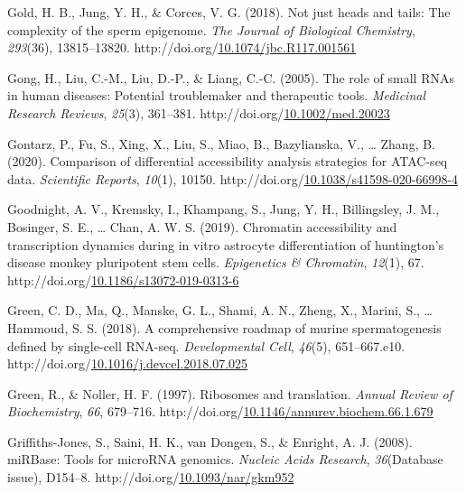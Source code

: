 \documentclass[12pt,twoside]{reedthesis}
\newlength{\cslhangindent}
\newenvironment{CSLReferences}[2] %
 {%
  \setlength{\parindent}{0pt}
  \ifodd #1 \everypar{\setlength{\hangindent}{\cslhangindent}}\ignorespaces\fi
  \ifnum #2 > 0
  \setlength{\parskip}{#2\baselineskip}
  \fi
 }%
 {}
\begin{document}
\begin{CSLReferences}{1}{0}
\leavevmode{}%
Gold, H. B., Jung, Y. H., \& Corces, V. G. (2018). Not just heads and tails: The complexity of the sperm epigenome. \emph{The Journal of Biological Chemistry}, \emph{293}(36), 13815--13820. http://doi.org/\href{https://doi.org/10.1074/jbc.R117.001561}{10.1074/jbc.R117.001561}

\leavevmode{}%
Gong, H., Liu, C.-M., Liu, D.-P., \& Liang, C.-C. (2005). The role of small RNAs in human diseases: Potential troublemaker and therapeutic tools. \emph{Medicinal Research Reviews}, \emph{25}(3), 361--381. http://doi.org/\href{https://doi.org/10.1002/med.20023}{10.1002/med.20023}

\leavevmode{}%
Gontarz, P., Fu, S., Xing, X., Liu, S., Miao, B., Bazylianska, V., \ldots{} Zhang, B. (2020). Comparison of differential accessibility analysis strategies for ATAC-seq data. \emph{Scientific Reports}, \emph{10}(1), 10150. http://doi.org/\href{https://doi.org/10.1038/s41598-020-66998-4}{10.1038/s41598-020-66998-4}

\leavevmode{}%
Goodnight, A. V., Kremsky, I., Khampang, S., Jung, Y. H., Billingsley, J. M., Bosinger, S. E., \ldots{} Chan, A. W. S. (2019). Chromatin accessibility and transcription dynamics during in vitro astrocyte differentiation of huntington's disease monkey pluripotent stem cells. \emph{Epigenetics \& Chromatin}, \emph{12}(1), 67. http://doi.org/\href{https://doi.org/10.1186/s13072-019-0313-6}{10.1186/s13072-019-0313-6}

\leavevmode{}%
Green, C. D., Ma, Q., Manske, G. L., Shami, A. N., Zheng, X., Marini, S., \ldots{} Hammoud, S. S. (2018). A comprehensive roadmap of murine spermatogenesis defined by single-cell RNA-seq. \emph{Developmental Cell}, \emph{46}(5), 651--667.e10. http://doi.org/\href{https://doi.org/10.1016/j.devcel.2018.07.025}{10.1016/j.devcel.2018.07.025}

\leavevmode{}%
Green, R., \& Noller, H. F. (1997). Ribosomes and translation. \emph{Annual Review of Biochemistry}, \emph{66}, 679--716. http://doi.org/\href{https://doi.org/10.1146/annurev.biochem.66.1.679}{10.1146/annurev.biochem.66.1.679}

\leavevmode{}%
Griffiths-Jones, S., Saini, H. K., van Dongen, S., \& Enright, A. J. (2008). miRBase: Tools for microRNA genomics. \emph{Nucleic Acids Research}, \emph{36}(Database issue), D154--8. http://doi.org/\href{https://doi.org/10.1093/nar/gkm952}{10.1093/nar/gkm952}


\end{CSLReferences}
\end{document}
